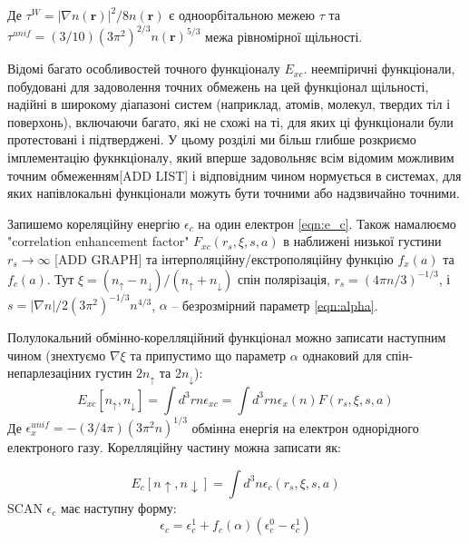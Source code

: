 Де $\tau^W = |\nabla{n(\textbf{r})}|^2/8n(\textbf{r})$ є одноорбітальною межею $\tau$ \newline та $\tau^{unif} = (3/10)(3\pi^2)^{2/3}n(\textbf{r})^{5/3}$ межа рівномірної щільності.

Відомі багато особливостей точного функціоналу $E_{xc}$. неемпіричні функціонали, побудовані для задоволення точних обмежень на цей функціонал щільності, надійні в широкому діапазоні систем (наприклад, атомів, молекул, твердих тіл і поверхонь), включаючи багато, які не схожі на ті, для яких ці функціонали були протестовані і підтверджені. У цьому розділі ми більш глибше розкриємо імплементацію фукнкціоналу, який вперше задовольняє всім відомим можливим точним обмеженням[ADD LIST] і відповідним чином нормується в системах, для яких напівлокальні функціонали можуть бути точними або надзвичайно точними.

Запишемо кореляційну енергію $\epsilon_c$ на один електрон \ref{eqn:e_c}. Також намалюємо "correlation enhancement factor" $F_{xc}(r_s, \xi, s, a)$ в наближені низької густини $r_s \rightarrow \infty$ [ADD GRAPH] та інтерполяційну/екстрополяційну функцію $f_x(a)$ та $f_c(a)$. Тут $\xi = (n_\uparrow - n_\downarrow)/(n_\uparrow + n_\downarrow)$ спін полярізація, $r_s = (4 \pi n/3)^{-1/3}$, і $s = {|\nabla{n}|}/{2(3\pi^2)^{-1/3}n^{4/3}}$, $\alpha$ -- безрозмірний параметр \ref{eqn:alpha}. 

Полулокальний обмінно-корелляційний функціонал можно записати наступним чином (знехтуємо $\nabla \xi$ та припустимо що параметр $\alpha$ однаковий для спін-непарлезаціних густин $2n_\uparrow$ та $2n_\downarrow$):
\begin{equation}
	\label{eqn:semilocalexc}
	E_{xc}[n_{\uparrow},n_{\downarrow}] = \int{d^3 r n\epsilon_{xc} = \int d^3 r n \epsilon_{x}(n)F(r_s,\xi, s, a)}
\end{equation}
Де $\epsilon_x^{unif} = -(3/4\pi)(3\pi^2n)^{1/3}$ обмінна енергія на електрон однорідного електроного газу.  
Корелляційну частину можна записати як: 

\begin{equation}
	\label{eqn:cor}
	E_{c}[n\uparrow,n\downarrow] = \int{d^3 n \epsilon_c (r_s,\xi, s, a)}
\end{equation}
SCAN $\epsilon_c$ має наступну форму:
\begin{equation}
	\label{eqn:e_c}
	\epsilon_c = \epsilon_c^1 + f_c(\alpha)(\epsilon_c^0 -\epsilon_c^1)
\end{equation}

